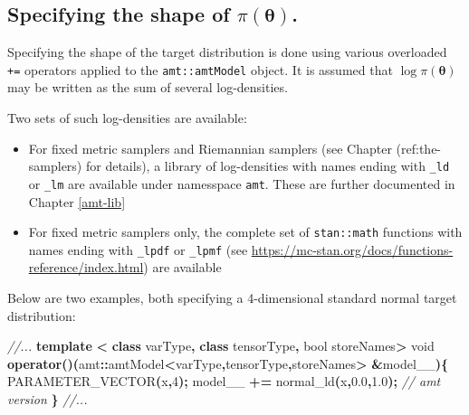 \documentclass[
]{book}
\newenvironment{Shaded}{\begin{snugshade}}{\end{snugshade}}
\newcommand{\CommentTok}[1]{\textcolor[rgb]{0.56,0.35,0.01}{\textit{#1}}}
\newcommand{\DataTypeTok}[1]{\textcolor[rgb]{0.13,0.29,0.53}{#1}}
\newcommand{\DecValTok}[1]{\textcolor[rgb]{0.00,0.00,0.81}{#1}}
\newcommand{\FloatTok}[1]{\textcolor[rgb]{0.00,0.00,0.81}{#1}}
\newcommand{\KeywordTok}[1]{\textcolor[rgb]{0.13,0.29,0.53}{\textbf{#1}}}
\newcommand{\NormalTok}[1]{#1}
\newcommand{\OperatorTok}[1]{\textcolor[rgb]{0.81,0.36,0.00}{\textbf{#1}}}
\begin{document}
\hypertarget{specifying-the-shape-of-piboldsymbol-theta.}{%
\subsection{\texorpdfstring{Specifying the shape of \(\pi(\boldsymbol \theta)\).}{Specifying the shape of \textbackslash pi(\textbackslash boldsymbol \textbackslash theta).}}\label{specifying-the-shape-of-piboldsymbol-theta.}}

Specifying the shape of the target distribution is done using various overloaded \texttt{+=} operators applied to the \texttt{amt::amtModel} object. It is assumed that \(\log \pi(\boldsymbol \theta)\) may be written as the sum of
several log-densities.

Two sets of such log-densities are available:

\begin{itemize}
\item
  For fixed metric samplers and Riemannian samplers (see Chapter (ref:the-samplers) for details), a library of
  log-densities with names ending with \texttt{\_ld} or \texttt{\_lm} are available under namesspace \texttt{amt}. These are further documented in Chapter \ref{amt-lib}
\item
  For fixed metric samplers only, the complete set of \texttt{stan::math} functions with names ending with \texttt{\_lpdf} or \texttt{\_lpmf} (see \url{https://mc-stan.org/docs/functions-reference/index.html}) are available
\end{itemize}

Below are two examples, both specifying a 4-dimensional standard normal target distribution:

\begin{Shaded}
\begin{Highlighting}[]
\CommentTok{//...}
  \KeywordTok{template} \OperatorTok{\textless{}} \KeywordTok{class}\NormalTok{ varType}\OperatorTok{,} \KeywordTok{class}\NormalTok{ tensorType}\OperatorTok{,} \DataTypeTok{bool}\NormalTok{ storeNames}\OperatorTok{\textgreater{}}
  \DataTypeTok{void} \KeywordTok{operator}\OperatorTok{()(}\NormalTok{amt}\OperatorTok{::}\NormalTok{amtModel}\OperatorTok{\textless{}}\NormalTok{varType}\OperatorTok{,}\NormalTok{tensorType}\OperatorTok{,}\NormalTok{storeNames}\OperatorTok{\textgreater{}} \OperatorTok{\&}\NormalTok{model\_\_}\OperatorTok{)\{}
\NormalTok{    PARAMETER\_VECTOR}\OperatorTok{(}\NormalTok{x}\OperatorTok{,}\DecValTok{4}\OperatorTok{);}
\NormalTok{    model\_\_ }\OperatorTok{+=}\NormalTok{ normal\_ld}\OperatorTok{(}\NormalTok{x}\OperatorTok{,}\FloatTok{0.0}\OperatorTok{,}\FloatTok{1.0}\OperatorTok{);} \CommentTok{// amt version}
  \OperatorTok{\}}
\CommentTok{//...}
\end{Highlighting}
\end{Shaded}
\end{document}
